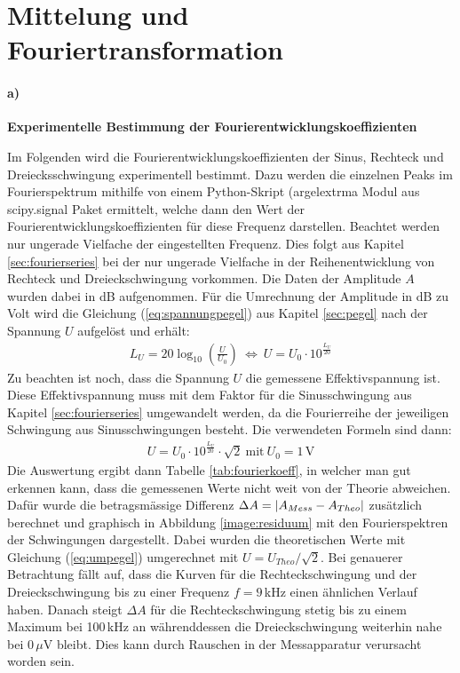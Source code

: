 
\section{Mittelung und Fouriertransformation}
\label{sec:mittelungAndTrafo}

\paragraph{a)}\textbf{Experimentelle Bestimmung der Fourierentwicklungskoeffizienten}

Im Folgenden wird die Fourierentwicklungskoeffizienten der Sinus, Rechteck und Dreiecksschwingung experimentell bestimmt. Dazu werden die einzelnen Peaks im Fourierspektrum mithilfe von einem Python-Skript (argelextrma Modul aus scipy.signal Paket ermittelt, welche dann den Wert der Fourierentwicklungskoeffizienten für diese Frequenz darstellen. Beachtet werden nur ungerade Vielfache der eingestellten Frequenz. Dies folgt aus Kapitel \ref{sec:fourierseries} bei der nur ungerade Vielfache in der Reihenentwicklung von Rechteck und Dreieckschwingung vorkommen. Die Daten der Amplitude $A$ wurden dabei in dB aufgenommen. Für die Umrechnung der Amplitude in dB zu Volt wird die Gleichung (\ref{eq:spannungpegel}) aus Kapitel \ref{sec:pegel} nach der Spannung $U$ aufgelöst und erhält:
\begin{gather}
    L_U = 20 \log_{10}\left(\frac{U}{U_0}\right)~\Leftrightarrow~U = U_0 \cdot 10^{\frac{L_U}{20}}
    \label{eq:umpegel}
\end{gather}
Zu beachten ist noch, dass die Spannung $U$ die gemessene Effektivspannung ist. Diese Effektivspannung muss mit dem Faktor für die Sinusschwingung aus Kapitel \ref{sec:fourierseries} umgewandelt werden, da die Fourierreihe der jeweiligen Schwingung aus Sinusschwingungen besteht. Die verwendeten Formeln sind dann:
\begin{gather}
    U = U_0 \cdot 10^{\frac{L_U}{20}} \cdot \sqrt{2}  ~\text{mit}~U_0=1\,\text{V}
    \label{eq:umrechnung}
\end{gather}
Die Auswertung ergibt dann Tabelle \ref{tab:fourierkoeff}, in welcher man gut erkennen kann, dass die gemessenen Werte nicht weit von der Theorie abweichen. Dafür wurde die betragsmässige Differenz $\Delta A = \abs{A_{Mess}-A_{Theo}}$ zusätzlich berechnet und graphisch in Abbildung \ref{image:residuum} mit den Fourierspektren der Schwingungen dargestellt. Dabei wurden die theoretischen Werte mit Gleichung (\ref{eq:umpegel}) umgerechnet mit $U = U_{Theo}/\sqrt{2}$. Bei genauerer Betrachtung fällt auf, dass die Kurven für die Rechteckschwingung und der Dreieckschwingung bis zu einer Frequenz $f=9$\,kHz einen ähnlichen Verlauf haben. Danach steigt $\Delta A$ für die Rechteckschwingung stetig bis zu einem Maximum bei 100\,kHz an währenddessen die Dreieckschwingung weiterhin nahe bei 0\,$\mu$V bleibt. Dies kann durch Rauschen in der Messapparatur verursacht worden sein.
